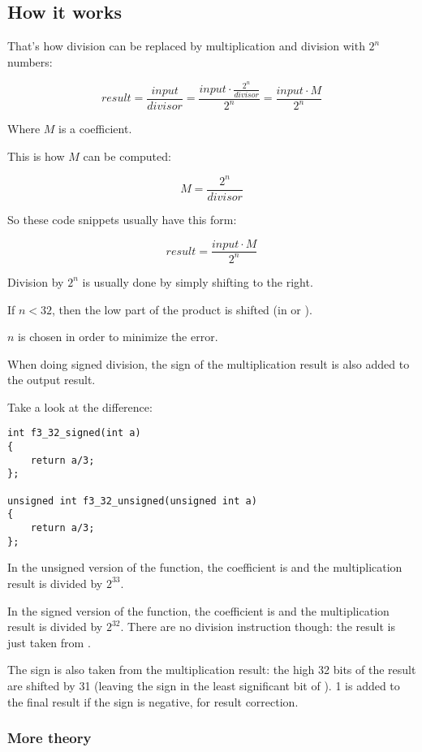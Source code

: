 ﻿\subsection{How it works}

That's how division can be replaced by multiplication and division with $2^{n}$ numbers:

\[
	result = 
	\frac{input}{divisor} = 
	\frac{input \cdot \frac{2^{n}}{divisor}}{2^{n}} = 
	\frac{input \cdot M}{2^{n}}
\]

Where $M$ is a  coefficient.

This is how $M$ can be computed:

\[
	M = \frac{2^{n}}{divisor}
\]

So these code snippets usually have this form:

\[
	result = \frac{input \cdot M}{2^{n}}
\]

%
Division by $2^{n}$ is usually done by simply shifting to the right.

If $n<32$, then the low part of the \gls{product} is shifted (in \EAX or \RAX).

$n$ is chosen in order to minimize the error.

When doing signed division, the sign of the multiplication result is also added to the output result.

Take a look at the difference:

\begin{lstlisting}
int f3_32_signed(int a)
{
	return a/3;
};

unsigned int f3_32_unsigned(unsigned int a)
{
	return a/3;
};
\end{lstlisting}

In the unsigned version of the function, the  coefficient is  
and the multiplication result is divided by $2^{33}$.

In the signed version of the function, the  coefficient is  
and the multiplication result is divided by $2^{32}$.
There are no division instruction though: the result is just taken from \EDX. 

The sign is also taken from the multiplication result: the high 32 bits of the result are shifted by 31
(leaving the sign in the least significant bit of \EAX).
1 is added to the final result if the sign is negative, for result correction.



\subsubsection{More theory}


